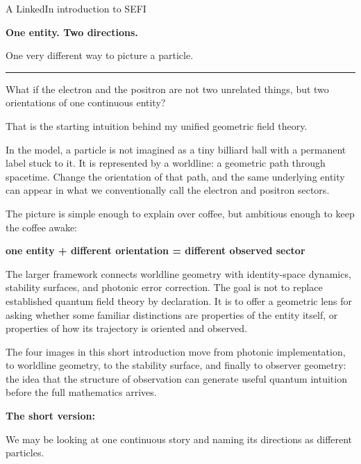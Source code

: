 \documentclass[11pt]{article}
\newcommand{\ruleline}{\textcolor{gold}{\rule{\linewidth}{1.2pt}}}
\begin{document}
{\sffamily\color{blue}\large A LinkedIn introduction to SEFI}\par
\vspace{0.25em}
{\sffamily\bfseries\fontsize{28}{31}\selectfont One entity. Two directions.\par\vspace{0.1em}One very different way to picture a particle.}\par
\vspace{0.55em}
\ruleline
\vspace{0.85em}

{\large
What if the electron and the positron are not two unrelated things, but two orientations of one continuous entity?}

That is the starting intuition behind my unified geometric field theory.

In the model, a particle is not imagined as a tiny billiard ball with a permanent label stuck to it. It is represented by a worldline: a geometric path through spacetime. Change the orientation of that path, and the same underlying entity can appear in what we conventionally call the electron and positron sectors.

The picture is simple enough to explain over coffee, but ambitious enough to keep the coffee awake:

\begin{center}
{\sffamily\bfseries\large one entity + different orientation = different observed sector}
\end{center}

The larger framework connects worldline geometry with identity-space dynamics, stability surfaces, and photonic error correction. The goal is not to replace established quantum field theory by declaration. It is to offer a geometric lens for asking whether some familiar distinctions are properties of the entity itself, or properties of how its trajectory is oriented and observed.

The four images in this short introduction move from photonic implementation, to worldline geometry, to the stability surface, and finally to observer geometry: the idea that the structure of observation can generate useful quantum intuition before the full mathematics arrives.

\vfill
{\sffamily\bfseries\color{blue}The short version:}\par
\vspace{0.25em}
{\large We may be looking at one continuous story and naming its directions as different particles.}
\end{document}
